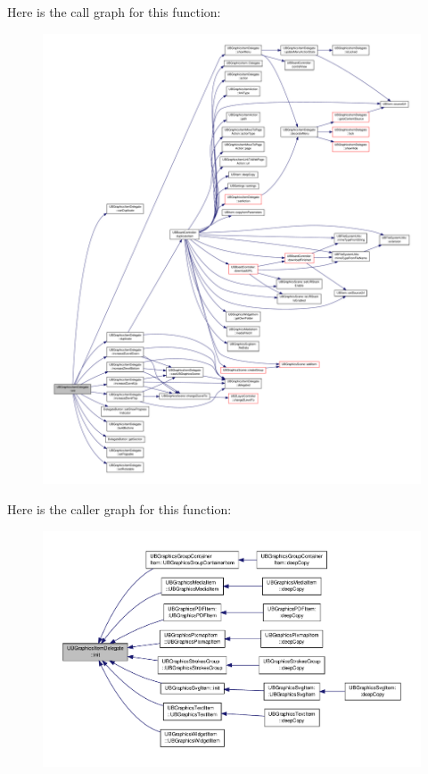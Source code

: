 Here is the call graph for this function\-:
\nopagebreak
\begin{figure}[H]
\begin{center}
\leavevmode
\includegraphics[width=350pt]{dd/dd5/class_u_b_graphics_item_delegate_a1de77276aba7276defacd0b87c9b87c7_cgraph}
\end{center}
\end{figure}




Here is the caller graph for this function\-:
\nopagebreak
\begin{figure}[H]
\begin{center}
\leavevmode
\includegraphics[width=350pt]{dd/dd5/class_u_b_graphics_item_delegate_a1de77276aba7276defacd0b87c9b87c7_icgraph}
\end{center}
\end{figure}


